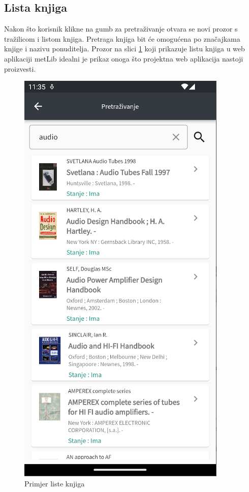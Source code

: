 	\subsection{Lista knjiga}
	
	Nakon što korisnik klikne na gumb za pretraživanje otvara se novi prozor s tražilicom i listom knjiga. Pretraga knjiga bit će omogućena po značajkama knjige i nazivu ponuditelja. Prozor na slici \ref{fig:lista knjiga} koji prikazuje listu knjiga u web aplikaciji metLib idealni je prikaz onoga što projektna web aplikacija nastoji proizvesti.
	
	\begin{figure}[H]
		\includegraphics[scale=0.4]{slike/BookList.PNG} %
		\centering
		\caption{Primjer liste knjiga}
		\label{fig:lista knjiga}
	\end{figure}
	
